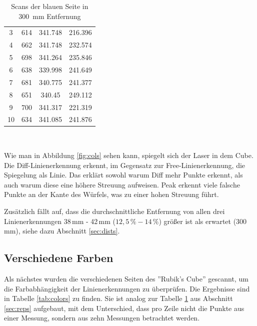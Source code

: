 \documentclass[ngerman,a4paper,parskip=half]{scrartcl}
\begin{document}
\begin{table}[H]
\begin{tabular}{c|c|c|c}
		3 & 614 & 341.748 & 216.396 \\
		4 & 662 & 341.748 & 232.574 \\
		5 & 698 & 341.264 & 235.846 \\
		6 & 638 & 339.998 & 241.649 \\
		7 & 681 & 340.775 & 241.377 \\
		8 & 651 & 340.45 & 249.112 \\
		9 & 700 & 341.317 & 221.319 \\
		10 & 634 & 341.085 & 241.876 \\
		\end{tabular} \
	\caption{Scans der blauen Seite in 300~mm Entfernung}
	\label{tab:reps}
\end{table}

Wie man in Abbildung \ref{fig:cols} sehen kann, spiegelt sich der Laser in dem Cube. Die Diff-Linienerkennung erkennt, im Gegensatz zur Free-Linienerkennung, die Spiegelung als Linie. Das erklärt sowohl warum Diff mehr Punkte erkennt, als auch warum diese eine höhere Streuung aufweisen.
Peak erkennt viele falsche Punkte an der Kante des Würfels, was zu einer hohen Streuung führt.

Zusätzlich fällt auf, dass die durchschnittliche Entfernung von allen drei Linienerkennungen 38\,mm - 42\,mm ($12,5\,\%-14\,\%$) größer ist als erwartet (300\,mm), siehe dazu Abschnitt \ref{sec:dists}.

\subsection{Verschiedene Farben}
\label{sec:cols}

Als nächstes wurden die verschiedenen Seiten des ''Rubik's Cube'' gescannt, um die Farbabhängigkeit der Linienerkennungen zu überprüfen. Die Ergebnisse sind in Tabelle \ref{tab:colors} zu finden. Sie ist analog zur Tabelle \ref{tab:reps} aus Abschnitt \ref{sec:reps} aufgebaut, mit dem Unterschied, dass pro Zeile nicht die Punkte aus einer Messung, sondern aus zehn Messungen betrachtet werden.
\end{document}

